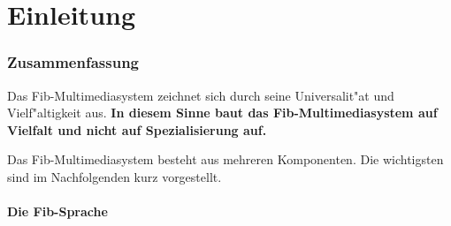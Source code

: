 \documentclass[11pt,a4paper]{article}
\begin{document}
\tableofcontents

\clearpage
{}

\part{Einleitung}

\section{Zusammenfassung}

Das Fib-Multimediasystem zeichnet sich durch seine Universalit"at und Vielf"altigkeit aus.
\textbf{In diesem Sinne baut das Fib-Multimediasystem auf Vielfalt und nicht auf Spezialisierung auf.}

Das Fib-Multimediasystem besteht aus mehreren Komponenten. Die wichtigsten sind im Nachfolgenden kurz vorgestellt.

\subsection{Die Fib-Sprache}
\end{document}

